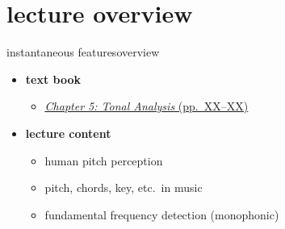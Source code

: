 

\subtitle{Part 6: Tonal Analysis}


	

    \section[overview]{lecture overview}
        \begin{frame}{instantaneous features}{overview}
            \begin{itemize}
                \item   \textbf{text book}  
                    \begin{itemize}
                        \item   \href{http://ieeexplore.ieee.org/xpl/articleDetails.jsp?tp=&arnumber=&}{\underline{\textit{Chapter 5: Tonal Analysis} (pp.~XX--XX)}}
                    \end{itemize}
                \bigskip
                \item<2->   \textbf{lecture content}
                    \begin{itemize}
                        \item<2->   human pitch perception
                        \item<3->   pitch, chords, key, etc.\ in music
                        \item<4->   fundamental frequency detection (monophonic)
                    \end{itemize}
            \end{itemize}
        \end{frame}

